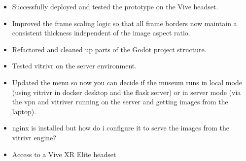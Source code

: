 \documentclass{article}
\begin{document}
\done
\begin{itemize}
    \item Successfully deployed and tested the prototype on the Vive headset.
    \item Improved the frame scaling logic so that all frame borders now maintain a consistent thickness independent of the image aspect ratio.
    \item Refactored and cleaned up parts of the Godot project structure.
    \item Tested vitrivr on the server environment.
    \item Updated the menu so now you can decide if the museum runs in local mode (using vitrivr in docker desktop and the flask server) or in server mode (via the vpn and vitriver running on the server and getting images from the laptop).
\end{itemize}

\support
\begin{itemize}
    \item nginx is installed but how do i configure it to serve the images from the vitrivr engine?
    \item Access to a Vive XR Elite headset
\end{itemize}

\plan
{}
\end{document}
